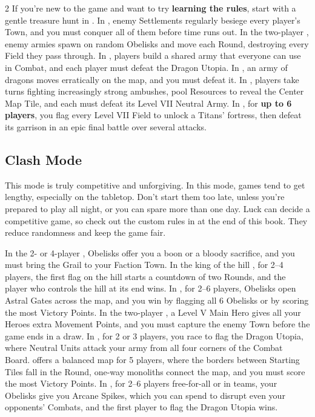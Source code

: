 \begin{multicols*}{2}
If you're new to the game and want to try \textbf{learning the rules}, start with a gentle treasure hunt in .
In , enemy Settlements regularly besiege every player's Town, and you must conquer all of them before time runs out.
In the two-player , enemy armies spawn on random Obelisks and move each Round, destroying every Field they pass through.
In , players build a shared army that everyone can use in Combat, and each player must defeat the Dragon Utopia.
In , an army of dragons moves erratically on the map, and you must defeat it.
In , players take turns fighting increasingly strong ambushes, pool Resources to reveal the Center Map Tile, and each must defeat its Level VII Neutral Army.
In , for \textbf{up to 6 players}, you flag every Level VII Field to unlock a Titans' fortress, then defeat its garrison in an epic final battle over several attacks.

\subsection*{Clash Mode}

This mode is truly competitive and unforgiving.
In this mode, games tend to get lengthy, especially on the tabletop.
Don't start them too late, unless you're prepared to play all night, or you can spare more than one day.
Luck can decide a competitive game, so check out the custom rules in  at the end of this book.
They reduce randomness and keep the game fair.

In the 2- or 4-player , Obelisks offer you a boon or a bloody sacrifice, and you must bring the Grail to your Faction Town.
In the king of the hill , for 2--4 players, the first flag on the hill starts a countdown of two Rounds, and the player who controls the hill at its end wins.
In , for 2--6 players, Obelisks open Astral Gates across the map, and you win by flagging all 6 Obelisks or by scoring the most Victory Points.
In the two-player , a Level V Main Hero gives all your Heroes extra Movement Points, and you must capture the enemy Town before the game ends in a draw.
In , for 2 or 3 players, you race to flag the Dragon Utopia, where Neutral Units attack your army from all four corners of the Combat Board.
 offers a balanced map for 5 players, where the borders between Starting Tiles fall in the  Round, one-way monoliths connect the map, and you must score the most Victory Points.
In , for 2--6 players free-for-all or in teams, your Obelisks give you Arcane Spikes, which you can spend to disrupt even your opponents' Combats, and the first player to flag the Dragon Utopia wins.


\end{multicols*}
